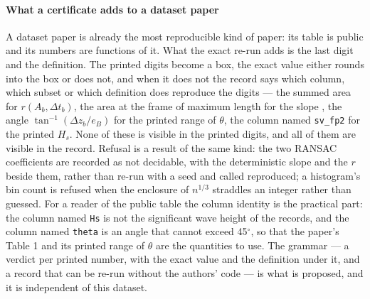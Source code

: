 \documentclass[preprint,11pt,authoryear]{elsarticle}
\begin{document}
\paragraph{What a certificate adds to a dataset paper}
A dataset paper is already the most reproducible kind of paper: its table is public and its numbers are functions of it. What the exact re-run adds is the last digit and the definition. The printed digits become a box, the exact value either rounds into the box or does not, and when it does not the record says which column, which subset or which definition does reproduce the digits --- the summed area for $r(A_b, \Delta t_b)$, the area at the frame of maximum length for the slope \FitAbLDPrinted, the angle $\tan^{-1}(\Delta z_b/e_B)$ for the printed range of $\theta$, the column named \texttt{sv\_fp2} for the printed $H_s$. None of these is visible in the printed digits, and all of them are visible in the record. Refusal is a result of the same kind: the two RANSAC coefficients are recorded as not decidable, with the deterministic slope and the $r$ beside them, rather than re-run with a seed and called reproduced; a histogram's bin count is refused when the enclosure of $n^{1/3}$ straddles an integer rather than guessed. For a reader of the public table the column identity is the practical part: the column named \texttt{Hs} is not the significant wave height of the records, and the column named \texttt{theta} is an angle that cannot exceed 45$^\circ$, so that the paper's Table 1 and its printed range of $\theta$ are the quantities to use. The grammar --- a verdict per printed number, with the exact value and the definition under it, and a record that can be re-run without the authors' code --- is what is proposed, and it is independent of this dataset.
\end{document}
